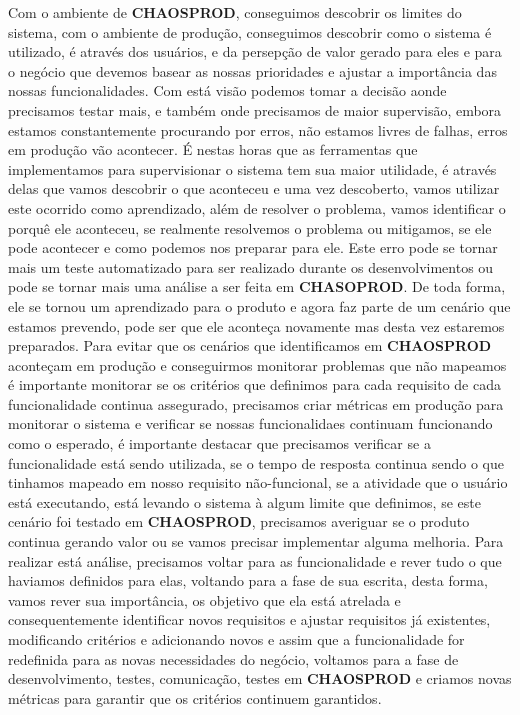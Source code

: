       Com o ambiente de \textbf{CHAOSPROD}, conseguimos descobrir os limites do
      sistema, com o ambiente de produção, conseguimos descobrir como o sistema é
      utilizado, é através dos usuários, e da persepção de valor gerado para eles
      e para o negócio que devemos basear as nossas prioridades e ajustar a
      importância das nossas funcionalidades. Com está visão podemos tomar a decisão
      aonde precisamos testar mais, e também onde precisamos de maior supervisão,
      embora estamos constantemente procurando por erros, não estamos livres de
      falhas, erros em produção vão acontecer. É nestas horas que as ferramentas
      que implementamos para supervisionar o sistema tem sua maior utilidade, é
      através delas que vamos descobrir o que aconteceu e uma vez descoberto, vamos
      utilizar este ocorrido como aprendizado, além de resolver o problema, vamos
      identificar o porquê ele aconteceu, se realmente resolvemos o problema ou
      mitigamos, se ele pode acontecer e como podemos nos preparar para ele. Este
      erro pode se tornar mais um teste automatizado para ser realizado durante os
      desenvolvimentos ou pode se tornar mais uma análise a ser feita em
      \textbf{CHASOPROD}. De toda forma, ele se tornou um aprendizado para o produto
      e agora faz parte de um cenário que estamos prevendo, pode ser que ele
      aconteça novamente mas desta vez estaremos preparados. \newline
      Para evitar que os cenários que identificamos em \textbf{CHAOSPROD} aconteçam
      em produção e conseguirmos monitorar problemas que não mapeamos é importante
      monitorar se os critérios que definimos para cada requisito de cada funcionalidade
      continua assegurado, precisamos criar métricas em produção para monitorar
      o sistema e verificar se nossas funcionalidaes continuam funcionando como o
      esperado, é importante destacar que precisamos verificar se a funcionalidade
      está sendo utilizada, se o tempo de resposta continua sendo o que tinhamos
      mapeado em nosso requisito não-funcional, se a atividade que o usuário está
      executando, está levando o sistema à algum limite que definimos, se este
      cenário foi testado em \textbf{CHAOSPROD}, precisamos averiguar se o
      produto continua gerando valor ou se vamos precisar implementar alguma
      melhoria. Para realizar está análise, precisamos voltar para as funcionalidade
      e rever tudo o que haviamos definidos para elas, voltando para a fase de
      sua escrita, desta forma, vamos rever sua importância, os objetivo que ela
      está atrelada e consequentemente identificar novos requisitos e ajustar
      requisitos já existentes, modificando critérios e adicionando novos e
      assim que a funcionalidade for redefinida para as novas necessidades do
      negócio, voltamos para a fase de desenvolvimento, testes, comunicação,
      testes em \textbf{CHAOSPROD} e criamos novas métricas para garantir que
      os critérios continuem garantidos.

